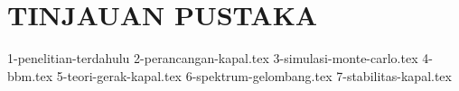 \chapter{TINJAUAN PUSTAKA}
\label{chap:tinjauanpustaka}

{1-penelitian-terdahulu}
{2-perancangan-kapal.tex}
{3-simulasi-monte-carlo.tex}
{4-bbm.tex}
{5-teori-gerak-kapal.tex}
{6-spektrum-gelombang.tex}
{7-stabilitas-kapal.tex}
